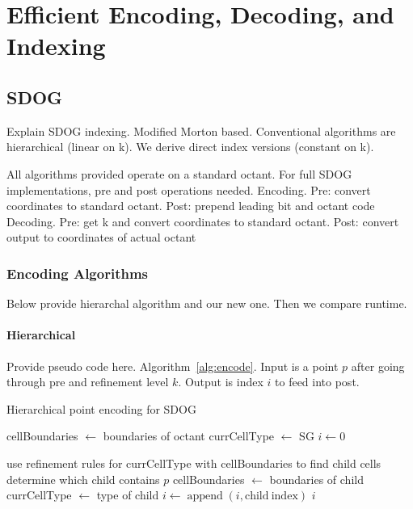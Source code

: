 \chapter{Efficient Encoding, Decoding, and Indexing} \label{chap:coding}


\section{SDOG}
Explain SDOG indexing.
Modified Morton based.
Conventional algorithms are hierarchical (linear on k).
We derive direct index versions (constant on k).

All algorithms provided operate on a standard octant. For full SDOG implementations, pre and post operations needed.
Encoding. Pre: convert coordinates to standard octant. Post: prepend leading bit and octant code
Decoding. Pre: get k and convert coordinates to standard octant. Post: convert output to coordinates of actual octant


\subsection{Encoding Algorithms}
Below provide hierarchal algorithm and our new one.
Then we compare runtime.


\subsubsection{Hierarchical}
Provide pseudo code here. Algorithm~\ref{alg:encode}. Input is a point $p$ after going through pre and refinement level $k$. Output is index $i$ to feed into post.


\begin{algorithm}
	\caption{Hierarchical point encoding for SDOG}
	
	\begin{algorithmic}
		
		\STATE cellBoundaries $\leftarrow$ boundaries of octant
		\STATE currCellType $\leftarrow$ SG
		\STATE $i \leftarrow 0$
		
			\STATE use refinement rules for currCellType with cellBoundaries to find child cells
			\STATE determine which child contains $p$
			\STATE cellBoundaries $\leftarrow$ boundaries of child
			\STATE currCellType $\leftarrow$ type of child
			\STATE $i \leftarrow \operatorname{append}(i, \mathrm{child~index})$
		\ENDFOR
		\RETURN $i$
		 
	\end{algorithmic}
	\label{alg:encode}
\end{algorithm}


